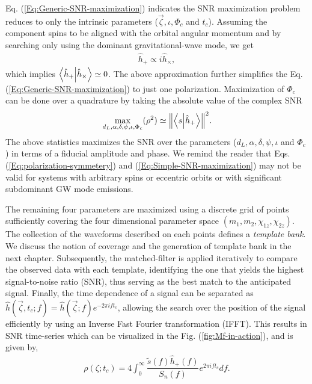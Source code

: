 Eq. (\ref{Eq:Generic-SNR-maximization}) indicates the SNR maximization problem reduces to only the intrinsic parameters ($\vec{\zeta}, \iota, \Phi_c$ and $t_c$). Assuming the component spins to be aligned with the orbital angular momentum and by searching only using the dominant gravitational-wave mode, we get  
\begin{align}
    \hat{h}_{+} \propto i\hat{h}_{\times},
    \label{Eq:polarization-symmetery}
\end{align}
which implies $\innerproduct{\hat{h}_+}{\hat{h}_{\times}} \simeq 0$. The above approximation further simplifies the Eq. (\ref{Eq:Generic-SNR-maximization}) to just one polarization. Maximization of $\Phi_c$ can be done over a quadrature by taking the absolute value of the complex SNR
\begin{align}
    \max_{d_L,\alpha, \delta, \psi, \iota, \Phi_c}(\rho^2) \simeq \norm{\innerproduct{s}{\hat{h}_+}}^2.
    \label{Eq:Simple-SNR-maximization}
\end{align}
The above statistics maximizes the SNR over the parameters ($d_L, \alpha, \delta, \psi, \iota$ and $\Phi_c$) in terms of a fiducial amplitude and phase. We remind the reader that Eqs. (\ref{Eq:polarization-symmetery}) and (\ref{Eq:Simple-SNR-maximization}) may not be valid for systems with arbitrary spins or eccentric orbits or with significant subdominant GW mode emissions.


The remaining four parameters are maximized using a discrete grid of points sufficiently covering the four dimensional parameter space $(m_1, m_2, \chi_{1z}, \chi_{2z})$. The collection of the waveforms described on each points defines a \textit{template bank}. We discuss the notion of coverage and the generation of template bank in the next chapter. Subsequently, the matched-filter is applied iteratively to compare the observed data with each template, identifying the one that yields the highest signal-to-noise ratio (SNR), thus serving as the best match to the anticipated signal. Finally, the time dependence of a signal can be separated as $\hat{h}(\vec{\zeta},t_c;f) = \hat{h}(\vec{\zeta};f)e^{-2\pi ift_c}$, allowing the search over the position of the signal efficiently by using an Inverse Fast Fourier transformation (IFFT). This results in SNR time-series which can be visualized in the Fig. (\ref{fig:Mf-in-action}), and is given by, 
\begin{align}
    \rho(\zeta;t_c) =  4\int_{0}^{\infty} \dfrac{\tilde{s}(f)\hat{h}_+(f)}{S_n(f)}e^{2\pi ift_c}df.
    \label{Eq:Matched-filter}
\end{align}


